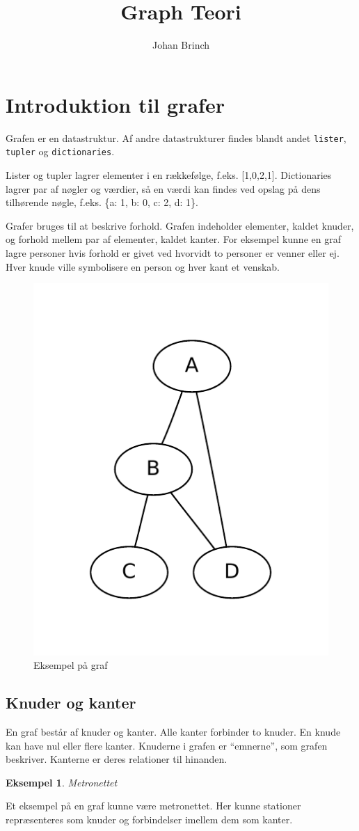 \documentclass[10pt,a4paper,danish]{article}
\title{Graph Teori}
\author{Johan Brinch}
\newcommand{\ct}{\texttt}
\newtheorem{example}{Eksempel}[subsection]
\begin{document}
\maketitle
\newpage


\tableofcontents
\newpage

\section{Introduktion til grafer}
Grafen er en datastruktur. Af andre datastrukturer findes blandt andet
\ct{lister}, \ct{tupler} og \ct{dictionaries}.

Lister og tupler lagrer elementer i en rækkefølge,
f.eks. [1,0,2,1]. Dictionaries lagrer par af nøgler og værdier, så en
værdi kan findes ved opslag på dens tilhørende nøgle, f.eks. \{a: 1,
b: 0, c: 2, d: 1\}.

Grafer bruges til at beskrive forhold. Grafen indeholder elementer,
kaldet knuder, og forhold mellem par af elementer, kaldet kanter.  For
eksempel kunne en graf lagre personer hvis forhold er givet ved
hvorvidt to personer er venner eller ej. Hver knude ville symbolisere
en person og hver kant et venskab.


\begin{figure}[h]
\centering
\includegraphics[width=.3\textwidth]{graphs/graph0.pdf}
\caption{Eksempel på graf}
\label{fig:graph0}
\end{figure}


\subsection{Knuder og kanter}
En graf består af knuder og kanter. Alle kanter forbinder to
knuder. En knude kan have nul eller flere kanter. Knuderne i grafen er
"`emnerne"', som grafen beskriver. Kanterne er deres relationer til
hinanden.


\begin{example}Metronettet\end{example}
  Et eksempel på en graf kunne være metronettet. Her kunne stationer
  repræsenteres som knuder og forbindelser imellem dem som kanter.
\end{document}
